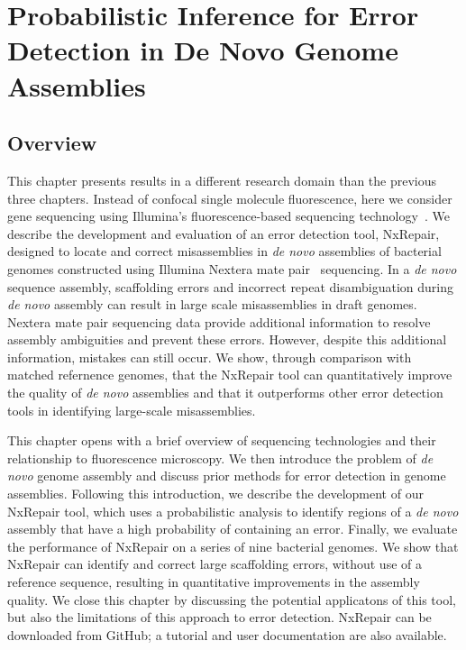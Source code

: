 \chapter{Probabilistic Inference for Error Detection in De Novo Genome Assemblies}
\label{chap:illumina}
\section{Overview}
This chapter presents results in a different research domain than the previous three chapters. Instead of confocal single molecule fluorescence, here we consider gene sequencing using Illumina's fluorescence-based sequencing technology~\cite{bentley2008}. We describe the development and evaluation of an error detection tool, NxRepair, designed to locate and correct misassemblies in \textit{de novo} assemblies of bacterial genomes constructed using Illumina Nextera mate pair~\cite{nextera2012} sequencing. In a \textit{de novo} sequence assembly, scaffolding errors and incorrect repeat disambiguation during \textit{de novo} assembly can result in large scale misassemblies in draft genomes. Nextera mate pair sequencing data provide additional information to resolve assembly ambiguities and prevent these errors. However, despite this additional information, mistakes can still occur. We show, through comparison with matched refernence genomes, that the NxRepair tool can quantitatively improve the quality of \textit{de novo} assemblies and that it outperforms other error detection tools in identifying large-scale misassemblies.

This chapter opens with a brief overview of sequencing technologies and their relationship to fluorescence microscopy. We then introduce the problem of \textit{de novo} genome assembly and discuss prior methods for error detection in genome assemblies. Following this introduction, we describe the development of our NxRepair tool, which uses a probabilistic analysis to identify regions of a \textit{de novo} assembly that have a high probability of containing an error. Finally, we evaluate the performance of NxRepair on a series of nine bacterial genomes. We show that NxRepair can identify and correct large scaffolding errors, without use of a reference sequence, resulting in quantitative improvements in the assembly quality. We close this chapter by discussing the potential applicatons of this tool, but also the limitations of this approach to error detection. NxRepair can be downloaded from GitHub; a tutorial and user documentation are also available.
 

